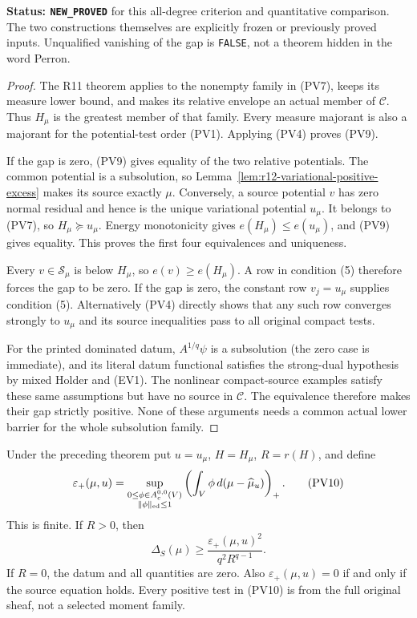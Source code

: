 \noindent\textbf{Status: \texttt{NEW\_PROVED}} for this
all-degree criterion and quantitative comparison. The two
constructions themselves are explicitly frozen or previously
proved inputs. Unqualified vanishing of the gap is
\texttt{FALSE}, not a theorem hidden in the word Perron.

\begin{proof}
The R11 theorem applies to the nonempty family in (PV7),
keeps its measure lower bound, and makes its relative
envelope an actual member of $\mathscr C$. Thus $H_\mu$
is the greatest member of that family. Every measure
majorant is also a majorant for the potential-test order
(PV1). Applying (PV4) proves (PV9).

If the gap is zero, (PV9) gives equality of the two
relative potentials. The common potential is a subsolution,
so Lemma~\ref{lem:r12-variational-positive-excess} makes
its source exactly $\mu$. Conversely, a source potential
$v$ has zero normal residual and hence is the unique
variational potential $u_\mu$. It belongs to (PV7), so
$H_\mu\succeq u_\mu$. Energy monotonicity gives
$e(H_\mu)\leq e(u_\mu)$, and (PV9) gives equality.
This proves the first four equivalences and uniqueness.

Every $v\in\mathscr S_\mu$ is below $H_\mu$, so
$e(v)\geq e(H_\mu)$. A row in condition (5) therefore
forces the gap to be zero. If the gap is zero, the
constant row $v_j=u_\mu$ supplies condition (5).
Alternatively (PV4) directly shows that any such row
converges strongly to $u_\mu$ and its source inequalities
pass to all original compact tests.

For the printed dominated datum, $A^{1/q}\psi$ is a
subsolution (the zero case is immediate), and its literal
datum functional satisfies the strong-dual hypothesis by
mixed Holder and (EV1). The nonlinear compact-source
examples satisfy these same assumptions but have no source
in $\mathscr C$. The equivalence therefore makes their
gap strictly positive. None of these arguments needs a
common actual lower barrier for the whole subsolution family.
\end{proof}

\begin{proposition}
\label{prop:r12-positive-test-gap-bound}
Under the preceding theorem put $u=u_\mu$, $H=H_\mu$,
$R=r(H)$, and define
\[
 \varepsilon_+(\mu,u)=
   \sup_{\substack{0\leq\phi\in A_c^{0,0}(V)\\
                   \|\phi\|_{\rm ed}\leq1}}
                   \left(\int_V\phi\,d(\mu-\widehat\mu_u)\right)_+.
 \tag{PV10}
\]
This is finite. If $R>0$, then
\[
       \Delta_S(\mu)\geq
          \frac{\varepsilon_+(\mu,u)^2}{q^2R^{q-1}}.
 \tag{PV11}
\]
If $R=0$, the datum and all quantities are zero. Also
$\varepsilon_+(\mu,u)=0$ if and only if the source equation
holds. Every positive test in (PV10) is from the full
original sheaf, not a selected moment family.
\end{proposition}

